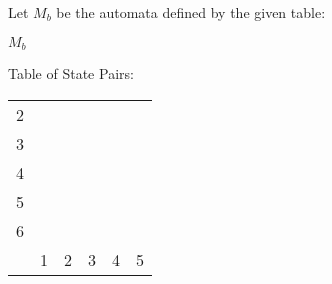 Let $M_b$ be the automata defined by the given table:
\begin{automata}{$M_b$}
	
	
	
	
	
	
	
	
\end{automata}

Table of State Pairs:
\begin{center} \begin{tabular}{*{6}{c|}}
									\cline{1-2}
	2 &  						\\	\cline{1-3}
	3 &   &  					\\	\cline{1-4}
	4 &   &   &  				\\	\cline{1-5}
	5 &   &   &   &  			\\	\cline{1-6}
	6 &   &   &   &   &  		\\	\hline
	  & 1 & 2 & 3 & 4 & 5		\\
\end{tabular} \end{center}